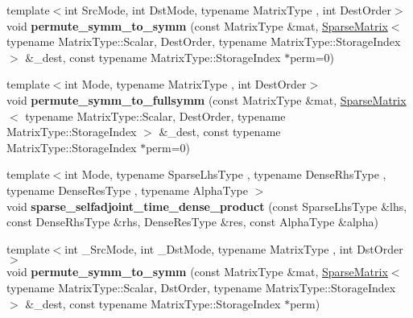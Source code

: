 \begin{DoxyCompactItemize}
{\footnotesize template$<$int Src\+Mode, int Dst\+Mode, typename Matrix\+Type , int Dest\+Order$>$ }\\void {\bfseries permute\+\_\+symm\+\_\+to\+\_\+symm} (const Matrix\+Type \&mat, \hyperlink{group___sparse_core___module_class_eigen_1_1_sparse_matrix}{Sparse\+Matrix}$<$ typename Matrix\+Type\+::\+Scalar, Dest\+Order, typename Matrix\+Type\+::\+Storage\+Index $>$ \&\+\_\+dest, const typename Matrix\+Type\+::\+Storage\+Index $\ast$perm=0)
\item 
\mbox{\label{namespace_eigen_1_1internal_a174eec9bebb6b3629a95b532d05e419c}} 
{\footnotesize template$<$int Mode, typename Matrix\+Type , int Dest\+Order$>$ }\\void {\bfseries permute\+\_\+symm\+\_\+to\+\_\+fullsymm} (const Matrix\+Type \&mat, \hyperlink{group___sparse_core___module_class_eigen_1_1_sparse_matrix}{Sparse\+Matrix}$<$ typename Matrix\+Type\+::\+Scalar, Dest\+Order, typename Matrix\+Type\+::\+Storage\+Index $>$ \&\+\_\+dest, const typename Matrix\+Type\+::\+Storage\+Index $\ast$perm=0)
\item 
\mbox{\label{namespace_eigen_1_1internal_a0c798cde7dad9e1c42ca567619eb1cce}} 
{\footnotesize template$<$int Mode, typename Sparse\+Lhs\+Type , typename Dense\+Rhs\+Type , typename Dense\+Res\+Type , typename Alpha\+Type $>$ }\\void {\bfseries sparse\+\_\+selfadjoint\+\_\+time\+\_\+dense\+\_\+product} (const Sparse\+Lhs\+Type \&lhs, const Dense\+Rhs\+Type \&rhs, Dense\+Res\+Type \&res, const Alpha\+Type \&alpha)
\item 
\mbox{\label{namespace_eigen_1_1internal_a2649bfc34f46b48ed846f70da6372841}} 
{\footnotesize template$<$int \+\_\+\+Src\+Mode, int \+\_\+\+Dst\+Mode, typename Matrix\+Type , int Dst\+Order$>$ }\\void {\bfseries permute\+\_\+symm\+\_\+to\+\_\+symm} (const Matrix\+Type \&mat, \hyperlink{group___sparse_core___module_class_eigen_1_1_sparse_matrix}{Sparse\+Matrix}$<$ typename Matrix\+Type\+::\+Scalar, Dst\+Order, typename Matrix\+Type\+::\+Storage\+Index $>$ \&\+\_\+dest, const typename Matrix\+Type\+::\+Storage\+Index $\ast$perm)
\item 
\mbox{\label{namespace_eigen_1_1internal_ae6ccd0013687eff21e8076dcc282efb8}} 

\end{DoxyCompactItemize}
